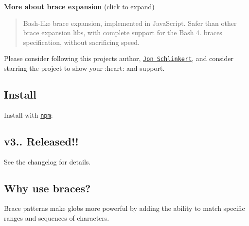 {\bfseries More about brace expansion} (click to expand)

\begin{quote}
Bash-\/like brace expansion, implemented in Java\+Script. Safer than other brace expansion libs, with complete support for the Bash 4. braces specification, without sacrificing speed. \end{quote}


Please consider following this project\textquotesingle{}s author, \href{https://github.com/jonschlinkert}{\tt Jon Schlinkert}, and consider starring the project to show your \+:heart\+: and support.

\subsection*{Install}

Install with \href{https://www.npmjs.com/}{\tt npm}\+:




\subsection*{v3.. Released!!}

See the changelog for details.

\subsection*{Why use braces?}

Brace patterns make globs more powerful by adding the ability to match specific ranges and sequences of characters.


